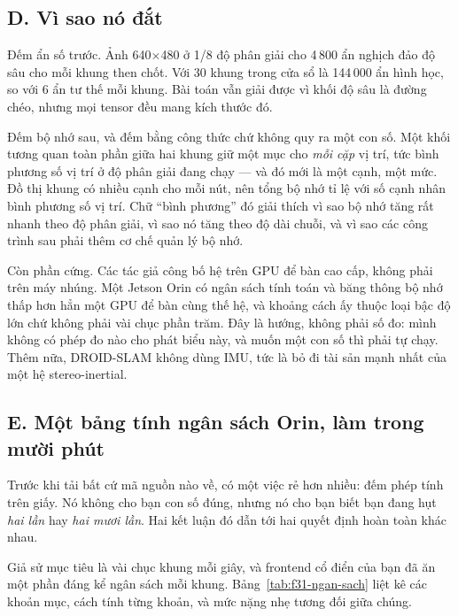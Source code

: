 \documentclass[../../deep_learning.tex]{subfiles}
\begin{document}
\subsection{D. Vì sao nó đắt}
Đếm ẩn số trước. Ảnh 640\(\times\)480 ở 1/8 độ phân giải cho 4\,800 ẩn nghịch đảo độ sâu cho mỗi khung then chốt. Với 30 khung trong cửa sổ là 144\,000 ẩn hình học, so với 6 ẩn tư thế mỗi khung. Bài toán vẫn giải được vì khối độ sâu là đường chéo, nhưng mọi tensor đều mang kích thước đó.

Đếm bộ nhớ sau, và đếm bằng công thức chứ không quy ra một con số. Một khối tương quan toàn phần giữa hai khung giữ một mục cho \emph{mỗi cặp} vị trí, tức bình phương số vị trí ở độ phân giải đang chạy --- và đó mới là một cạnh, một mức. Đồ thị khung có nhiều cạnh cho mỗi nút, nên tổng bộ nhớ tỉ lệ với số cạnh nhân bình phương số vị trí. Chữ ``bình phương'' đó giải thích vì sao bộ nhớ tăng rất nhanh theo độ phân giải, vì sao nó tăng theo độ dài chuỗi, và vì sao các công trình sau phải thêm cơ chế quản lý bộ nhớ.

Còn phần cứng. Các tác giả công bố hệ trên GPU để bàn cao cấp, không phải trên máy nhúng. Một Jetson Orin có ngân sách tính toán và băng thông bộ nhớ thấp hơn hẳn một GPU để bàn cùng thế hệ, và khoảng cách ấy thuộc loại bậc độ lớn chứ không phải vài chục phần trăm. Đây là hướng, không phải số đo: mình không có phép đo nào cho phát biểu này, và muốn một con số thì phải tự chạy. Thêm nữa, DROID-SLAM không dùng IMU, tức là bỏ đi tài sản mạnh nhất của một hệ stereo-inertial.

\subsection{E. Một bảng tính ngân sách Orin, làm trong mười phút}
Trước khi tải bất cứ mã nguồn nào về, có một việc rẻ hơn nhiều: đếm phép tính trên giấy. Nó không cho bạn con số đúng, nhưng nó cho bạn biết bạn đang hụt \emph{hai lần} hay \emph{hai mươi lần}. Hai kết luận đó dẫn tới hai quyết định hoàn toàn khác nhau.

Giả sử mục tiêu là vài chục khung mỗi giây, và frontend cổ điển của bạn đã ăn một phần đáng kể ngân sách mỗi khung. Bảng~\ref{tab:f31-ngan-sach} liệt kê các khoản mục, cách tính từng khoản, và mức nặng nhẹ tương đối giữa chúng.
\end{document}
